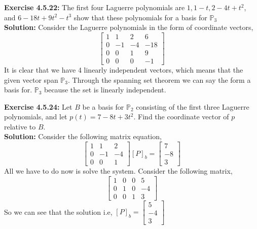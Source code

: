 \documentclass{amsart}
\def\PP{{\mathbb P}}
\begin{document}
\noindent\textbf{Exercise 4.5.22: } The first four Laguerre polynomials are $1, 1-t,2-4t+t^2$, and $6-18t+9t^2-t^3$ show that these polynomials for a basis for $\PP_3$\\
\noindent \textbf{Solution: } Consider the Laguerre polynomials in the form of coordinate vectors,\\
\begin{equation}
\begin{bmatrix}
1 &1&2&6\\
0&-1&-4&-18\\
0&0&1&9\\
0&0&0&-1
\end{bmatrix}
\end{equation}
It is clear that we have 4 linearly independent vectors, which means that the given vector span $\PP_3$. Through the spanning set theorem we can say the form a basis for. $\PP_3$ because the set is linearly independent. 
\vspace{1in}

\noindent\textbf{Exercise 4.5.24: }Let $B$ be a basis for $\PP_2$ consisting of the first three Laguerre polynomials, and let $p(t) = 7-8t+3t^2$. Find the coordinate vector of $p$ relative to $B$. \\

\noindent \textbf{Solution: } Consider the following matrix equation,
\begin{equation}
\begin{bmatrix}
1 &1&2\\
0&-1&-4\\
0&0&1
\end{bmatrix}
[P]_b = 
\begin{bmatrix}
7\\
-8\\
3
\end{bmatrix}
\end{equation}
All we have to do now is solve the system. Consider the following matrix,
\begin{equation}
\begin{bmatrix}
1 &0&0&5\\
0&1&0&-4\\
0&0&1&3
\end{bmatrix}
\end{equation}
So we can see that the solution i.e, $[P]_b = \begin{bmatrix}
5\\
-4\\
3
\end{bmatrix}$ 
\vspace{1in}
\end{document}
